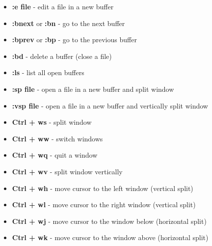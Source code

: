 \documentclass[twocolumn]{article}
\providecommand{\tightlist}{%
  \setlength{\itemsep}{0pt}\setlength{\parskip}{0pt}}
\begin{document}
\begin{itemize}
\tightlist
\item
  \textbf{:e file} - edit a file in a new buffer
\item
  \textbf{:bnext} or \textbf{:bn} - go to the next buffer
\item
  \textbf{:bprev} or \textbf{:bp} - go to the previous buffer
\item
  \textbf{:bd} - delete a buffer (close a file)
\item
  \textbf{:ls} - list all open buffers
\item
  \textbf{:sp file} - open a file in a new buffer and split window
\item
  \textbf{:vsp file} - open a file in a new buffer and vertically split
  window
\item
  \textbf{Ctrl + ws} - split window
\item
  \textbf{Ctrl + ww} - switch windows
\item
  \textbf{Ctrl + wq} - quit a window
\item
  \textbf{Ctrl + wv} - split window vertically
\item
  \textbf{Ctrl + wh} - move cursor to the left window (vertical split)
\item
  \textbf{Ctrl + wl} - move cursor to the right window (vertical split)
\item
  \textbf{Ctrl + wj} - move cursor to the window below (horizontal
  split)
\item
  \textbf{Ctrl + wk} - move cursor to the window above (horizontal
  split)
\end{itemize}
\end{document}
